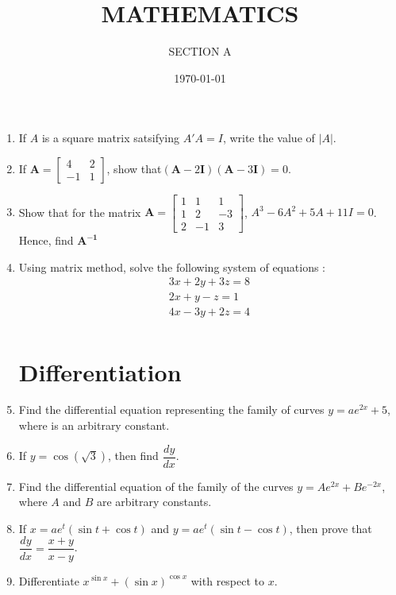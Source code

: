 \documentclass[2pt,-letter paper]{article}
\title{MATHEMATICS}
\author{SECTION A}
\date{\today}
\let\vec\mathbf{}
\let\vec\mathbf{}
\let\vec\mathbf{}
\providecommand{\myvec}[1]{\ensuremath{\begin{bmatrix}#1\end{bmatrix}}}
\providecommand{\brak}[1]{\ensuremath{\left(#1\right)}}
\begin{document}
\maketitle

\begin{enumerate}
\section{Matrix}
\item If $A$ is a square matrix satsifying $A'A=I$, write the value of $\vert A \vert$.
\item If $\vec{A}= \myvec{4&2\\-1& 1}$, show that$\brak{\vec{A}-2\vec{I}}\brak{\vec{A}-3\vec{I}}= 0$.
\item Show that for the matrix $\vec{A}=\myvec{1&1&1 \\ 1&2&-3 \\ 2&-1&3}$, ${A}^3-6{A}^2+5{A}+11{I}=0$. Hence, find $\vec{A^{-1}}$
	\item Using matrix method, solve the following system of equations :
		\begin{align*}
			{3x+2y+3z}=8 \\
			{2x+y-z}=1 \\
			{4x-3y+2z}=4 \\
		\end{align*}
\section{Differentiation}
\item Find the differential equation representing the family of curves $y=ae^{2x}+5$, where  is an arbitrary constant.
\item If $y=\cos(\sqrt{3})$, then find $\dfrac{dy}{dx}$.
\item Find the differential equation of the family of the curves $y = Ae^{2x} + Be^{-2x}$, where $A$ and $B$ are arbitrary constants.
\item If ${x} = ae^{t}\brak{\sin{t}+\cos{t}}$ and ${y} = ae^{t}\brak{\sin{t}-\cos{t}}$, then prove that $\dfrac{dy}{dx} = \dfrac{x+y}{x-y}$.
\item Differentiate $x^{\sin x} + \brak{\sin x}^{\cos x}$ with respect to $x$.

\end{enumerate}
\end{document}
